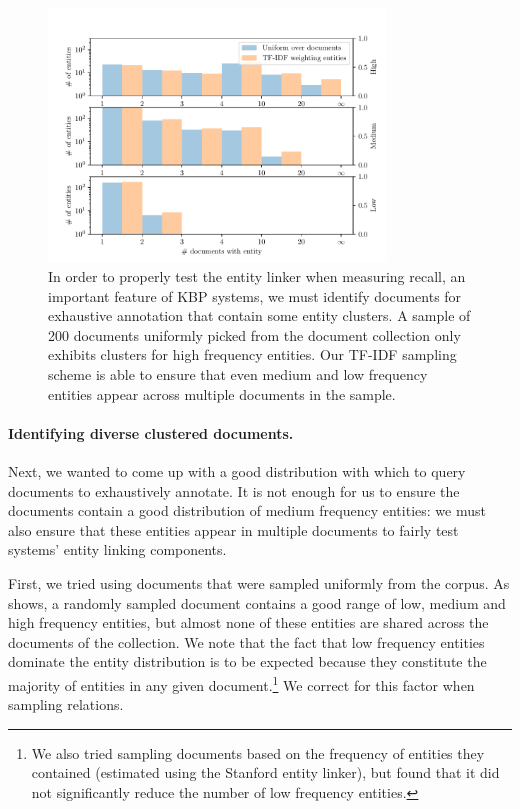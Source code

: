 \begin{figure}
  \centering
  \includegraphics[width=0.8\textwidth]{figures/analysis/exhaustive_entity_cross}
  \caption[Comparison of document sampling distributions]{\label{fig:kbpo:exhaustive-entity}
  In order to properly test the entity linker when measuring recall, an important feature of KBP systems, we must identify documents for exhaustive annotation that contain some entity clusters.
  A sample of 200 documents uniformly picked from the document collection only exhibits clusters for high frequency entities.
  Our TF-IDF sampling scheme is able to ensure that even medium and low frequency entities appear across multiple documents in the sample.
  }
\end{figure}


\paragraph{Identifying diverse clustered documents.}
Next, we wanted to come up with a good distribution with which to query documents to exhaustively annotate.
It is not enough for us to ensure the documents contain a good distribution of medium frequency entities: we must also ensure that these entities appear in multiple documents to fairly test systems' entity linking components.

First, we tried using documents that were sampled uniformly from the corpus.
As  shows, 
a randomly sampled document contains a good range of low, medium and high frequency entities, but almost none of these entities are shared across the documents of the collection.
We note that the fact that low frequency entities dominate the entity distribution is to be expected because they constitute the majority of entities in any given document.\footnote{%
  We also tried sampling documents based on the frequency of entities they contained (estimated using the Stanford entity linker), but found that it did not significantly reduce the number of low frequency entities.}
We correct for this factor when sampling relations.

